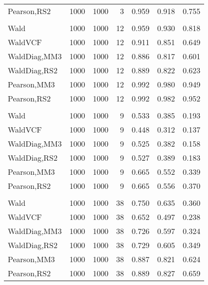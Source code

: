 \documentclass[
]{article}
\begin{document}
\begin{table}[H]
{\begin{tabular}[t]{lrrrrrr}
\hspace{1em}Pearson,RS2 & 1000 & 1000 & 3 & 0.959 & 0.918 & 0.755\\
\addlinespace[0.3em]
\multicolumn{7}{l}{\textbf{1F 15V}}\\
\hspace{1em}Wald & 1000 & 1000 & 12 & 0.959 & 0.930 & 0.818\\
\hspace{1em}WaldVCF & 1000 & 1000 & 12 & 0.911 & 0.851 & 0.649\\
\hspace{1em}WaldDiag,MM3 & 1000 & 1000 & 12 & 0.886 & 0.817 & 0.601\\
\hspace{1em}WaldDiag,RS2 & 1000 & 1000 & 12 & 0.889 & 0.822 & 0.623\\
\hspace{1em}Pearson,MM3 & 1000 & 1000 & 12 & 0.992 & 0.980 & 0.949\\
\hspace{1em}Pearson,RS2 & 1000 & 1000 & 12 & 0.992 & 0.982 & 0.952\\
\addlinespace[0.3em]
\multicolumn{7}{l}{\textbf{2F 10V}}\\
\hspace{1em}Wald & 1000 & 1000 & 9 & 0.533 & 0.385 & 0.193\\
\hspace{1em}WaldVCF & 1000 & 1000 & 9 & 0.448 & 0.312 & 0.137\\
\hspace{1em}WaldDiag,MM3 & 1000 & 1000 & 9 & 0.525 & 0.382 & 0.158\\
\hspace{1em}WaldDiag,RS2 & 1000 & 1000 & 9 & 0.527 & 0.389 & 0.183\\
\hspace{1em}Pearson,MM3 & 1000 & 1000 & 9 & 0.665 & 0.552 & 0.339\\
\hspace{1em}Pearson,RS2 & 1000 & 1000 & 9 & 0.665 & 0.556 & 0.370\\
\addlinespace[0.3em]
\multicolumn{7}{l}{\textbf{3F 15V}}\\
\hspace{1em}Wald & 1000 & 1000 & 38 & 0.750 & 0.635 & 0.360\\
\hspace{1em}WaldVCF & 1000 & 1000 & 38 & 0.652 & 0.497 & 0.238\\
\hspace{1em}WaldDiag,MM3 & 1000 & 1000 & 38 & 0.726 & 0.597 & 0.324\\
\hspace{1em}WaldDiag,RS2 & 1000 & 1000 & 38 & 0.729 & 0.605 & 0.349\\
\hspace{1em}Pearson,MM3 & 1000 & 1000 & 38 & 0.887 & 0.821 & 0.624\\
\hspace{1em}Pearson,RS2 & 1000 & 1000 & 38 & 0.889 & 0.827 & 0.659\\
\bottomrule
\end{tabular}}
\endgroup{}
\end{table}
\end{document}
